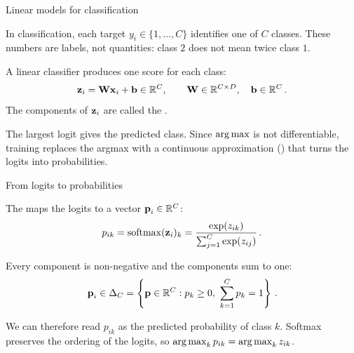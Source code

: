 \begin{frame}{Linear models for classification}

	\justifying
	In classification, each target $y_i\in\{1,\ldots,C\}$ identifies one of $C$ classes. These numbers are labels, not quantities: class $2$ does not mean twice class $1$.

	\begin{tcolorbox}[nndsblue]
		A linear classifier produces one score for each class:
		\begin{equation}
			\boldsymbol{\mathbf{z}}_i=\boldsymbol{\mathbf{W}}\boldsymbol{\mathbf{x}}_i+\boldsymbol{\mathbf{b}}\in\mathbb{R}^{C},
			\qquad
			\boldsymbol{\mathbf{W}}\in\mathbb{R}^{C\times D},
			\quad
			\boldsymbol{\mathbf{b}}\in\mathbb{R}^{C} \,.
		\end{equation}
		The components of $\boldsymbol{\mathbf{z}}_i$ are called the .
	\end{tcolorbox}

	\begin{tcolorbox}[nndsorange,boxsep=1mm,top=1mm,bottom=1mm]
		The largest logit gives the predicted class. Since $\operatorname*{arg\,max}$ is not differentiable, training replaces the argmax with a continuous approximation () that turns the logits into probabilities.
	\end{tcolorbox}

\end{frame}

\begin{frame}{From logits to probabilities}

	\justifying
	\begin{tcolorbox}[nndsblue,boxsep=1mm,top=1mm,bottom=1mm]
		The  maps the logits to a vector $\boldsymbol{\mathbf{p}}_i\in\mathbb{R}^{C}$:
		\begin{equation}
			p_{ik}
			=\operatorname{softmax}(\boldsymbol{\mathbf{z}}_i)_k
			=\frac{\exp(z_{ik})}{\sum_{j=1}^{C}\exp(z_{ij})} \,.
		\end{equation}
	\end{tcolorbox}

	\begin{tcolorbox}[nndsgreen,boxsep=1mm,top=1mm,bottom=1mm]
		Every component is non-negative and the components sum to one:
		\begin{equation}
			\vc{p}_i\in\Delta_C
			=\left\{\vc{p}\in\mathbb{R}^{C}:p_k\geq 0,\ \sum_{k=1}^{C}p_k=1\right\} \,.
		\end{equation}
	\end{tcolorbox}

	We can therefore read $p_{ik}$ as the predicted probability of class $k$. Softmax preserves the ordering of the logits, so $\operatorname*{arg\,max}_k p_{ik}=\operatorname*{arg\,max}_k z_{ik}$.

\end{frame}

